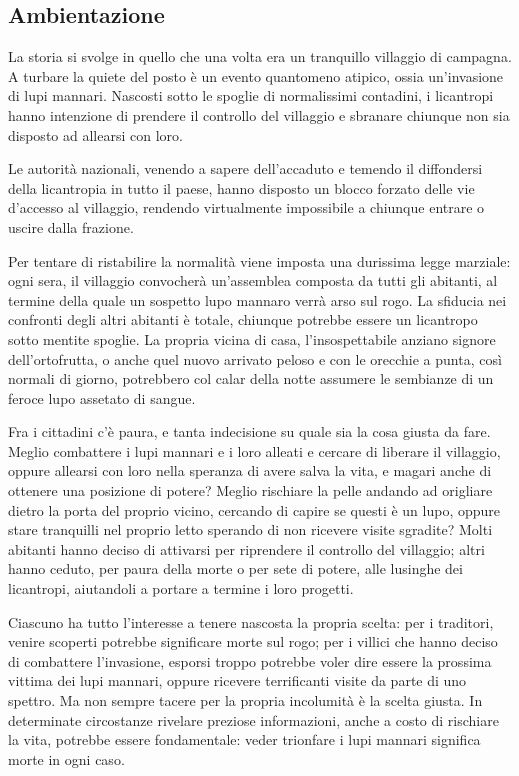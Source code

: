 \documentclass[a4paper,10pt]{article}
\begin{document}
\subsection{Ambientazione}

La storia si svolge in quello che una volta era un tranquillo villaggio di campagna. A turbare la quiete del posto è un evento quantomeno atipico, ossia un'invasione di lupi mannari. Nascosti sotto le spoglie di normalissimi contadini, i licantropi hanno intenzione di prendere il controllo del villaggio e sbranare chiunque non sia disposto ad allearsi con loro.

Le autorità nazionali, venendo a sapere dell'accaduto e temendo il diffondersi della licantropia in tutto il paese, hanno disposto un blocco forzato delle vie d'accesso al villaggio, rendendo virtualmente impossibile a chiunque entrare o uscire dalla frazione.

Per tentare di ristabilire la normalità viene imposta una durissima legge marziale: ogni sera, il villaggio convocherà un'assemblea composta da tutti gli abitanti, al termine della quale un sospetto lupo mannaro verrà arso sul rogo. La sfiducia nei confronti degli altri abitanti è totale, chiunque potrebbe essere un licantropo sotto mentite spoglie. La propria vicina di casa, l'insospettabile anziano signore dell'ortofrutta, o anche quel nuovo arrivato peloso e con le orecchie a punta, così normali di giorno, potrebbero col calar della notte assumere le sembianze di un feroce lupo assetato di sangue.

Fra i cittadini c'è paura, e tanta indecisione su quale sia la cosa giusta da fare. Meglio combattere i lupi mannari e i loro alleati e cercare di liberare il villaggio, oppure allearsi con loro nella speranza di avere salva la vita, e magari anche di ottenere una posizione di potere? Meglio rischiare la pelle andando ad origliare dietro la porta del proprio vicino, cercando di capire se questi è un lupo, oppure stare tranquilli nel proprio letto sperando di non ricevere visite sgradite? Molti abitanti hanno deciso di attivarsi per riprendere il controllo del villaggio; altri hanno ceduto, per paura della morte o per sete di potere, alle lusinghe dei licantropi, aiutandoli a portare a termine i loro progetti.

Ciascuno ha tutto l'interesse a tenere nascosta la propria scelta: per i traditori, venire scoperti potrebbe significare morte sul rogo; per i villici che hanno deciso di combattere l'invasione, esporsi troppo potrebbe voler dire essere la prossima vittima dei lupi mannari, oppure ricevere terrificanti visite da parte di uno spettro. Ma non sempre tacere per la propria incolumità è la scelta giusta. In determinate circostanze rivelare preziose informazioni, anche a costo di rischiare la vita, potrebbe essere fondamentale: veder trionfare i lupi mannari significa morte in ogni caso.
\end{document}
